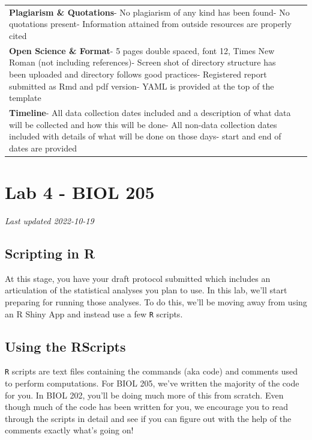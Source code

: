 \documentclass[
]{book}
\begin{document}
\begin{longtable}[]{@{}
  >{\raggedright\arraybackslash}p{}
  >{\raggedright\arraybackslash}p{}@{}}
\textbf{Plagiarism \& Quotations}- No plagiarism of any kind has been found- No quotations present- Information attained from outside resources are properly cited & 3 \\
\textbf{Open Science \& Format}- 5 pages double spaced, font 12, Times New Roman (not including references)- Screen shot of directory structure has been uploaded and directory follows good practices- Registered report submitted as Rmd and pdf version- YAML is provided at the top of the template & 4 \\
\textbf{Timeline}- All data collection dates included and a description of what data will be collected and how this will be done- All non-data collection dates included with details of what will be done on those days- start and end of dates are provided & 3 \\
\bottomrule()
\end{longtable}

\hypertarget{part-lab-4---biol-205}{%
\part*{Lab 4 - BIOL 205}\label{part-lab-4---biol-205}}

\emph{Last updated 2022-10-19}

\hypertarget{scripting-in-r}{%
\chapter*{Scripting in R}\label{scripting-in-r}}

At this stage, you have your draft protocol submitted which includes an articulation of the statistical analyses you plan to use. In this lab, we'll start preparing for running those analyses. To do this, we'll be moving away from using an R Shiny App and instead use a few \texttt{R} scripts.

\hypertarget{using-the-rscripts}{%
\chapter*{Using the RScripts}\label{using-the-rscripts}}

\texttt{R} scripts are text files containing the commands (aka code) and comments used to perform computations. For BIOL 205, we've written the majority of the code for you. In BIOL 202, you'll be doing much more of this from scratch. Even though much of the code has been written for you, we encourage you to read through the scripts in detail and see if you can figure out with the help of the comments exactly what's going on!
\end{document}
